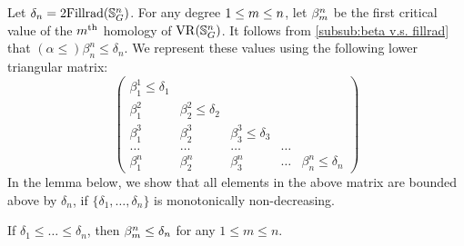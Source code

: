 Let $\delta_n=2\mathrm{Fillrad}(\mathbb{S}^n_G)$. %
For any degree $1 \leq m \leq n$, let $\beta_{m}^{n}$ be the first critical value of the $m^{\mathrm{th}}$ homology of $\operatorname{VR}(\mathbb{S}^n_G)$.
It follows from \cref{subsub:beta v.s. fillrad} that $(\alpha \leq) \beta_{n}^{n} \leq \delta_n$.
We represent these values using the following lower triangular matrix:
\[
    \begin{pmatrix}
        \beta_{1}^{1}\leq \delta_1 & & &&\\
        \beta_1^2 & \beta_{2}^{2} \leq \delta_2 & &&\\
        \beta_1^3 & \beta_{2}^{3} & \beta_{3}^{3} \leq \delta_3 &&\\
        \dots & \dots & \dots & \dots &\\
        \beta_1^n & \beta_2^n & \beta_3^n & \dots & \beta_n^n \leq \delta_n
    \end{pmatrix}
\]
In the lemma below, we show that all elements in the above matrix are bounded above by $\delta_n$, if $\{\delta_1, \dots, \delta_n\}$ is monotonically non-decreasing.

\medskip\lemma
If $\delta_1 \leq \dots \leq \delta_n$, then $\beta_{m}^{n} \leq \delta_n$ for any $1 \leq m \leq n$.

